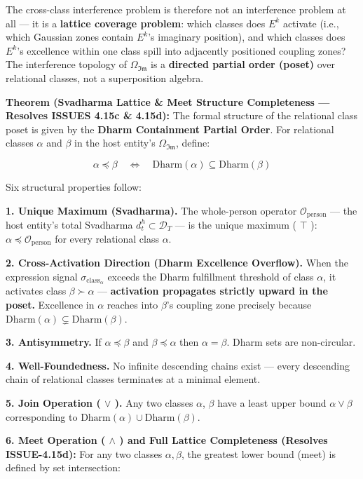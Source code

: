 \documentclass[11pt,a4paper]{article}
\theoremstyle{definition}
\theoremstyle{remark}
\begin{document}
The cross-class interference problem is therefore not an interference problem at all — it is a \textbf{lattice coverage problem}: which classes does $E^k$ activate (i.e., which Gaussian zones contain $E^k$'s imaginary position), and which classes does $E^k$'s excellence within one class spill into adjacently positioned coupling zones? The interference topology of $\Omega_{\mathfrak{Im}}$ is a \textbf{directed partial order (poset)} over relational classes, not a superposition algebra.

\textbf{Theorem (Svadharma Lattice \& Meet Structure Completeness — Resolves ISSUES 4.15c \& 4.15d):} The formal structure of the relational class poset is given by the \textbf{Dharm Containment Partial Order}. For relational classes $\alpha$ and $\beta$ in the host entity's $\Omega_{\mathfrak{Im}}$, define:


\begin{equation}
\alpha \preceq \beta \quad \iff \quad \text{Dharm}(\alpha) \subseteq \text{Dharm}(\beta)
\end{equation}


Six structural properties follow:

\textbf{1. Unique Maximum (Svadharma).} The whole-person operator $\mathcal{O}_{\text{person}}$ — the host entity's total Svadharma $d_t^h \subset \mathcal{D}_T$ — is the unique maximum ( $\top$ ): $\alpha \preceq \mathcal{O}_{\text{person}}$ for every relational class $\alpha$.

\textbf{2. Cross-Activation Direction (Dharm Excellence Overflow).} When the expression signal $\sigma_{\text{class}_\alpha}$ exceeds the Dharm fulfillment threshold of class $\alpha$, it activates class $\beta \succ \alpha$ — \textbf{activation propagates strictly upward in the poset.} Excellence in $\alpha$ reaches into $\beta$'s coupling zone precisely because $\text{Dharm}(\alpha) \subsetneq \text{Dharm}(\beta)$.

\textbf{3. Antisymmetry.} If $\alpha \preceq \beta$ and $\beta \preceq \alpha$ then $\alpha = \beta$. Dharm sets are non-circular.

\textbf{4. Well-Foundedness.} No infinite descending chains exist — every descending chain of relational classes terminates at a minimal element.

\textbf{5. Join Operation ( $\vee$ ).} Any two classes $\alpha$, $\beta$ have a least upper bound $\alpha \vee \beta$ corresponding to $\text{Dharm}(\alpha) \cup \text{Dharm}(\beta)$.

\textbf{6. Meet Operation ( $\wedge$ ) and Full Lattice Completeness (Resolves ISSUE-4.15d):} For any two classes $\alpha, \beta$, the greatest lower bound (meet) is defined by set intersection:
\end{document}

